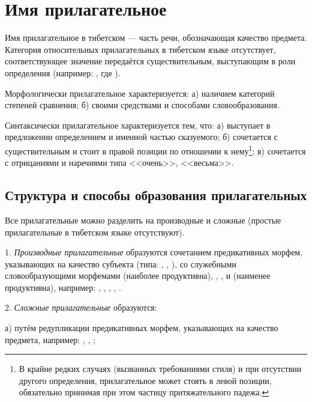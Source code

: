 \section{Имя прилагательное}

Имя прилагательное в тибетском --- часть речи, обозначающая качество предмета. Категория относительных прилагательных в тибетском языке отсутствует, соответствующее значение передаётся существительным, выступающим в роли определения (например: , где ).

Морфологически прилагательное характеризуется: а) наличием категорий степеней сравнения; б) своими средствами и способами словообразования.

Синтаксически прилагательное характеризуется тем, что:
а) выступает в предложении определением и именной частью сказуемого;
б) сочетается с существительным и стоит в правой позиции по отношении к нему\footnote[27]{В крайне редких случаях (вызванных требованиями стиля) и при отсутствии другого определения, прилагательное может стоять в левой позиции, обязательно принимая при этом частицу притяжательного падежа.};
в) сочетается с отрицаниями и наречиями типа <<очень>>, <<весьма>>.

\subsection{Структура и способы образования прилагательных}

Все прилагательные можно разделить на производные и сложные (простые прилагательные в тибетском языке отсутствуют).

1. \emph{Производные прилагательные} образуются сочетанием предикативных морфем, указывающих на качество субъекта (типа: , , ), со служебными словообразующими морфемами  (наиболее продуктивна), , ,  и  (наименее продуктивна), например:
,
,
,
,
.

2. \emph{Сложные прилагательные} образуются:

а) путём редупликации предикативных морфем, указывающих на качество предмета, например:
,
,
;

